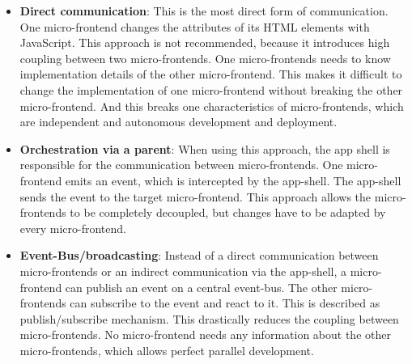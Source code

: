 \begin{itemize}
    \item \textbf{Direct communication}: This is the most direct form of communication. One micro-frontend changes the attributes of its HTML elements with JavaScript. This approach is not recommended, because it introduces high coupling between two micro-frontends. One micro-frontends needs to know implementation details of the other micro-frontend. This makes it difficult to change the implementation of one micro-frontend without breaking the other micro-frontend. And this breaks one characteristics of micro-frontends, which are independent and autonomous development and deployment.
    \item \textbf{Orchestration via a parent}: When using this approach, the app shell is responsible for the communication between micro-frontends. One micro-frontend emits an event, which is intercepted by the app-shell. The app-shell sends the event to the target micro-frontend. This approach allows the micro-frontends to be completely decoupled, but changes have to be adapted by every micro-frontend.
    \item \textbf{Event-Bus/broadcasting}: Instead of a direct communication between micro-frontends or an indirect communication via the app-shell, a micro-frontend can publish an event on a central event-bus. The other micro-frontends can subscribe to the event and react to it. This is described as publish/subscribe mechanism. This drastically reduces the coupling between micro-frontends. No micro-frontend needs any information about the other micro-frontends, which allows perfect parallel development.
\end{itemize}
